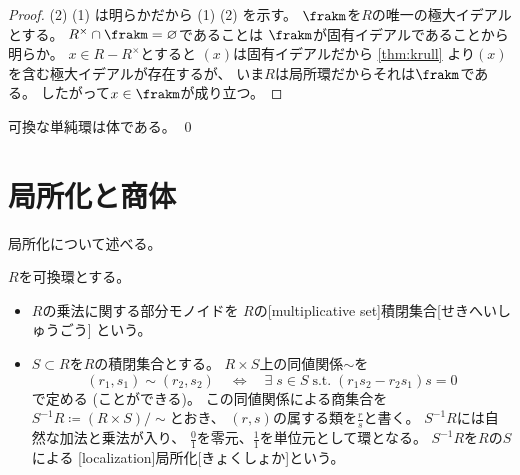 \documentclass[report]{jlreq}
\begin{document}
\begin{proof}
    (2) \Rightarrow (1) は明らかだから
    (1) \Rightarrow (2) を示す。
    $\frakm$を$R$の唯一の極大イデアルとする。
    $R^\times \cap \frakm = \emptyset$であることは
    $\frakm$が固有イデアルであることから明らか。
    $x \in R - R^\times$とすると
    $(x)$は固有イデアルだから
    \cref{thm:krull} より$(x)$を含む極大イデアルが存在するが、
    いま$R$は局所環だからそれは$\frakm$である。
    したがって$x \in \frakm$が成り立つ。
\end{proof}

\begin{corollary}
    可換な単純環は体である。
    \qed
\end{corollary}



%
\section{局所化と商体}

局所化について述べる。

\begin{definition}[局所化]
    $R$を可換環とする。
    \begin{itemize}
        \item $R$の乗法に関する部分モノイドを
            $R$の[multiplicative set]{積閉集合}[せきへいしゅうごう]
            という。
        \item $S \subset R$を$R$の積閉集合とする。
            $R \times S$上の同値関係$\sim$を
            \begin{equation}
                (r_1, s_1) \sim (r_2, s_2)
                    \quad \iff \quad
                    \exists \; s \in S
                    \; \text{s.t.} \;
                    (r_1 s_2 - r_2 s_1) s = 0
            \end{equation}
            で定める (ことができる)。
            この同値関係による商集合を
            $S^{-1}R \coloneqq (R \times S) / \sim$とおき、
            $(r, s)$の属する類を$\frac{r}{s}$と書く。
            $S^{-1}R$には自然な加法と乗法が入り、
            $\frac{0}{1}$を零元、$\frac{1}{1}$を単位元として環となる。
            $S^{-1}R$を$R$の$S$による
            [localization]{局所化}[きょくしょか]という。
    \end{itemize}
\end{definition}
\end{document}
